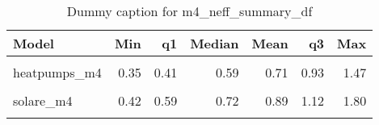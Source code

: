 \begin{table}
\centering
\caption{Dummy caption for m4_neff_summary_df}
\centering
\fontsize{10}{12}\selectfont
\begin{tabular}[t]{lrrrrrr}
\toprule
Model & Min & q1 & Median & Mean & q3 & Max\\
\midrule
\cellcolor{gray!10}{appliances\_m4} & \cellcolor{gray!10}{0.32} & \cellcolor{gray!10}{0.37} & \cellcolor{gray!10}{0.61} & \cellcolor{gray!10}{0.75} & \cellcolor{gray!10}{0.87} & \cellcolor{gray!10}{2.05}\\
heatpumps\_m4 & 0.35 & 0.41 & 0.59 & 0.71 & 0.93 & 1.47\\
\cellcolor{gray!10}{insulation\_m4} & \cellcolor{gray!10}{0.43} & \cellcolor{gray!10}{0.51} & \cellcolor{gray!10}{0.81} & \cellcolor{gray!10}{0.94} & \cellcolor{gray!10}{1.20} & \cellcolor{gray!10}{2.30}\\
solare\_m4 & 0.42 & 0.59 & 0.72 & 0.89 & 1.12 & 1.80\\
\cellcolor{gray!10}{windows\_m4} & \cellcolor{gray!10}{0.34} & \cellcolor{gray!10}{0.39} & \cellcolor{gray!10}{0.62} & \cellcolor{gray!10}{0.75} & \cellcolor{gray!10}{0.92} & \cellcolor{gray!10}{1.95}\\
\bottomrule
\end{tabular}
\end{table}
